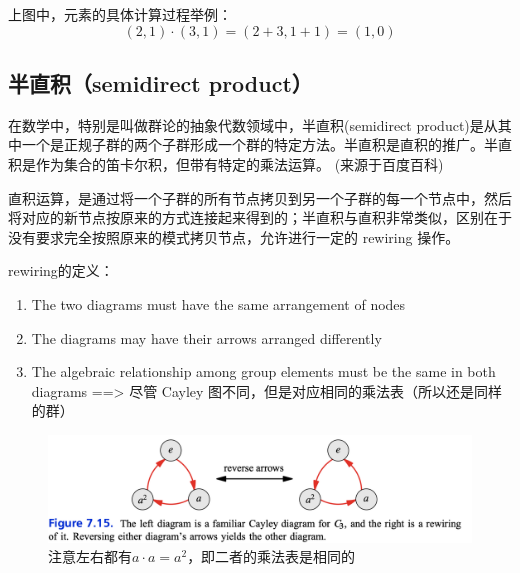 \documentclass[12pt]{article}
\begin{document}
上图中，元素的具体计算过程举例：
$$
(2, 1) \cdot (3, 1)  = (2 + 3, 1 + 1) = (1, 0)
$$


\subsection{半直积（semidirect product）}
在数学中，特别是叫做群论的抽象代数领域中，半直积(semidirect product)是从其中一个是正规子群的两个子群形成一个群的特定方法。半直积是直积的推广。半直积是作为集合的笛卡尔积，但带有特定的乘法运算。 (来源于百度百科)

直积运算，是通过将一个子群的所有节点拷贝到另一个子群的每一个节点中，然后将对应的新节点按原来的方式连接起来得到的；半直积与直积非常类似，区别在于没有要求完全按照原来的模式拷贝节点，允许进行一定的 rewiring 操作。
\begin{mdframed}[
linecolor=black!40,outerlinewidth=1pt,roundcorner=.5em,innertopmargin=1ex,innerbottommargin=.5\baselineskip,innerrightmargin=1em,innerleftmargin=1em,backgroundcolor=gray!5,
]
rewiring的定义：
\begin{enumerate}
\setlength{\itemsep}{0pt}
\setlength{\parsep}{0pt}
\setlength{\parskip}{0pt}
	\item The two diagrams must have the same arrangement of nodes
	\item The diagrams may have their arrows arranged differently
	\item The algebraic relationship among group elements must be the same in both diagrams ==> 尽管 Cayley 图不同，但是对应相同的乘法表（所以还是同样的群）
\end{enumerate}
\end{mdframed}
\begin{figure}[H]
    \centering
    \includegraphics[width=1\textwidth]{fig/Group/Cayley-C3-rewiring.png}
    \caption*{注意左右都有$a \cdot a = a^2$，即二者的乘法表是相同的}
\end{figure}
\end{document}
